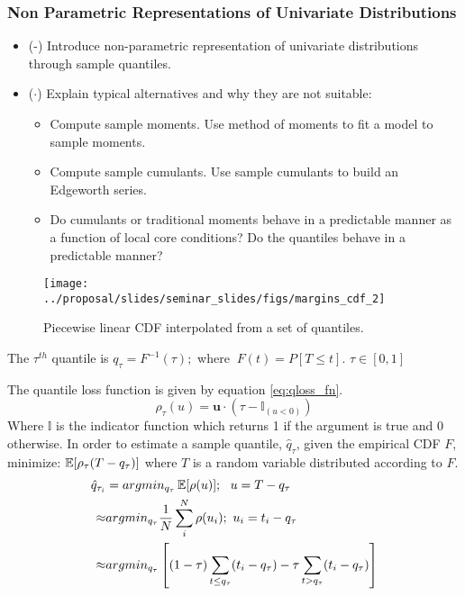 \subsubsection{Non Parametric Representations of Univariate Distributions}

\begin{itemize}
    \item (\checkmark-) Introduce non-parametric representation of univariate distributions through sample quantiles.
    \item ($\cdot$) Explain typical alternatives and why they are not suitable:
        \begin{itemize}
            \item Compute sample moments.  Use method of moments to fit a model to sample moments.
            \item Compute sample cumulants.  Use sample cumulants to build an Edgeworth series.
            \item Do cumulants or traditional moments behave in a predictable manner as a function of local core conditions?  Do the quantiles behave in a predictable manner?
        \end{itemize}
\end{itemize}

\begin{figure}[H]
    \centering
    \texttt{[image: ../proposal/slides/seminar\_slides/figs/margins\_cdf\_2]}
    \caption[CDF from quantiles.]{Piecewise linear CDF interpolated from a set of quantiles.}
    \label{fig:marginscdf2}
\end{figure}


The $\tau^{th}$ quantile is $q_\tau = F^{-1}(\tau); $ where $\ F(t)=P[T \leq t]$.
$\tau \in [0, 1]$

The quantile loss function is given by equation \ref{eq:qloss_fn}.
\begin{equation}
\rho_\tau( u) = \mathbf u \cdot (\tau - \mathbb{I}_{( u < 0)})
\label{eq:qloss_fn}
\end{equation}
Where $\mathbb{I}$ is the indicator function which returns 1 if the argument is true and 0 otherwise.
In order to estimate a sample quantile, $\hat q_\tau$, given the empirical CDF $F$, minimize: $\operatorname*{\mathbb{E}}[\rho_\tau(T - q_\tau)]$ where $T$ is a random variable distributed according to $F$.
\begin{equation}
            \left.\begin{aligned}
            \hat q_{\tau_i} &= argmin_{q_\tau} \operatorname*{\mathbb{E}}[\rho(u)];\ \  u = T - q_\tau  \\
            \approx & argmin_{q_\tau}  \frac{1}{N} \sum_i^N \rho(u_i); \ u_i = t_i - q_\tau \\
            \approx & argmin_{q_\tau} \left[ (1-\tau) \sum_{t \leq q_\tau}( t_i - q_\tau ) - \tau \sum_{t > q_\tau} (t_i - q_\tau) \right]
            \end{aligned}\right.
\end{equation}


